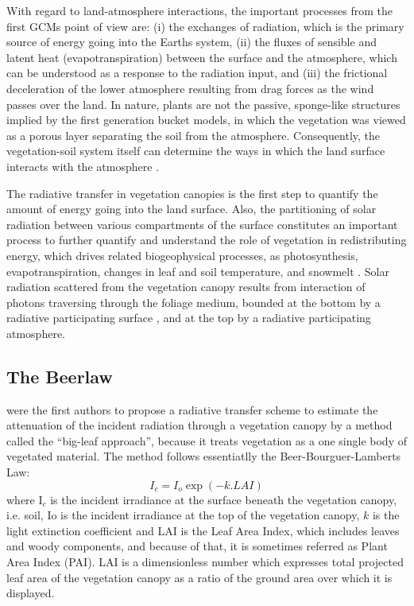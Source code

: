 With regard to land-atmosphere interactions, the important processes from the first GCMs point of view are: (i) the exchanges of radiation, which is the primary source of energy going into the Earth\textquotesingle s system, (ii) the fluxes of sensible and latent heat (evapotranspiration) between the surface and the atmosphere, which can be understood as a response to the radiation input, and (iii) the frictional deceleration of the lower atmosphere resulting from drag forces as the wind passes over the land. In nature, plants are not the passive, sponge-like structures implied by the first generation bucket models, in which the vegetation was viewed as a porous layer separating the soil from the atmosphere. Consequently, the vegetation-soil system itself can determine the ways in which the land surface interacts with the atmosphere \citep{Sellers1997}. 

The radiative transfer in vegetation canopies is the first step to quantify the amount of energy going into the land surface. Also, the partitioning of solar radiation between various compartments of the surface constitutes an important process to further quantify and understand the role of vegetation in redistributing energy, which drives related biogeophysical processes, as photosynthesis, evapotranspiration, changes in leaf and soil temperature, and snowmelt \citep{Alton2007,Widlowski2011}. Solar radiation scattered from the vegetation canopy results from interaction of photons traversing through the foliage medium, bounded at the bottom by a radiative participating surface \citep{Knyazikhin2005}, and at the top by a radiative participating atmosphere.

\subsection{The Beer\textquotesingle law}\label{sec:beers_law}

\citet{Monsi1953} were the first authors to propose a radiative transfer scheme to estimate the attenuation of the incident radiation through a vegetation canopy by a method called the ``big-leaf approach'', because it treats vegetation as a one single body of vegetated material. The method follows essentiatlly the Beer-Bourguer-Lambert\textquotesingle s Law:
\begin{equation}
I_c = I_o \exp{(-k.LAI)}
\end{equation}\label{eq:beerslaw}
\noindent where I$_c$ is the incident irradiance at the surface beneath the vegetation canopy, i.e. soil, Io is the incident irradiance at the top of the vegetation canopy, $k$ is the light extinction coefficient and LAI is the Leaf Area Index, which includes leaves and woody components, and because of that, it is sometimes referred as Plant Area Index (PAI). LAI is a dimensionless number which expresses total projected leaf area of the vegetation canopy as a ratio of the ground area over which it is displayed.

